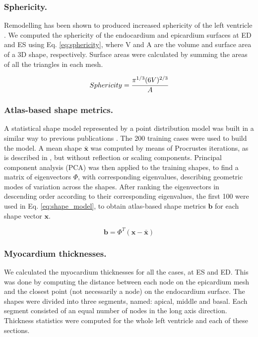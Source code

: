 \documentclass{llncs}
\begin{document}
\subsubsection{Sphericity.}Remodelling has been shown to produced increased sphericity of the left ventricle \cite{Sutton2000}. We  computed the sphericity \cite{Wadell1933} of the endocardium and epicardium surfaces at ED and ES using Eq. \ref{eq:sphericity}, where V and A are the volume and surface area of a 3D shape, respectively. Surface areas were calculated by summing the areas of all the triangles in each mesh.

\begin{equation} \label{eq:sphericity}
 Sphericity = \cfrac{\pi^{1/3}(6V)^{2/3}}{A} 
\end{equation}

\subsubsection{Atlas-based shape metrics.} 

A statistical shape model represented by a point distribution model was built in a similar way to previous publications \cite{VanAssen2006,Lotjonen2004}. The 200 training cases were used to build the model. A mean shape $\mathbf{\bar{x}}$ was computed by means of Procrustes iterations, as is described in \cite{Gower1975}, but without reflection or scaling components. Principal component analysis (PCA) was then applied to the training shapes, to find a matrix of eigenvectors $\Phi$, with corresponding eigenvalues, describing geometric modes of variation across the shapes. 
After ranking the eigenvectors in descending order according to their corresponding eigenvalues, the first 100 were used in Eq. \ref{eq:shape_model}, to obtain atlas-based shape metrics $\textbf{b} $ for each shape vector $ \textbf{x} $. 

\begin{equation} \label{eq:shape_model}
\textbf{b} = \Phi^T(\textbf{x} - \bar{\textbf{x}} )
\end{equation}

\subsubsection{Myocardium thicknesses.}
We calculated the myocardium thicknesses for all the cases, at ES and ED. This was done by computing the distance between each node on the epicardium mesh and the closest point (not necessarily a node) on the endocardium surface. The shapes were divided into three segments, named: apical, middle and basal. Each segment consisted of an equal number of nodes in the long axis direction. Thickness statistics were computed for the whole left ventricle and each of these sections.
\end{document}
